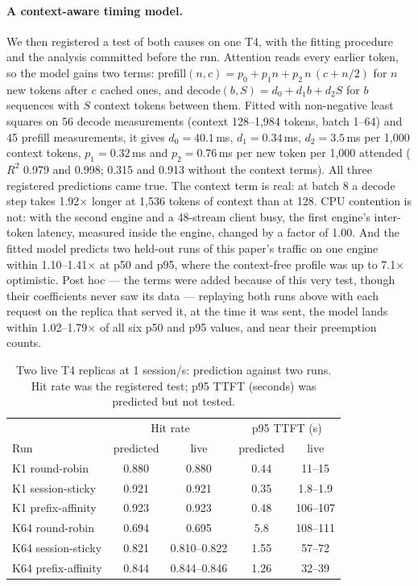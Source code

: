 \documentclass[10pt,twocolumn]{article}
\begin{document}
\paragraph{A context-aware timing model.} We then registered a test of both causes on one T4, with
the fitting procedure and the analysis committed before the run. Attention reads every earlier token,
so the model gains two terms: prefill$(n, c) = p_0 + p_1 n + p_2\, n\,(c + n/2)$ for $n$ new tokens
after $c$ cached ones, and decode$(b, S) = d_0 + d_1 b + d_2 S$ for $b$ sequences with $S$ context
tokens between them. Fitted with non-negative least squares on 56 decode measurements (context
128--1{,}984 tokens, batch 1--64) and 45 prefill measurements, it gives $d_0 = 40.1$\,ms,
$d_1 = 0.34$\,ms, $d_2 = 3.5$\,ms per 1{,}000 context tokens, $p_1 = 0.32$\,ms and $p_2 = 0.76$\,ms per
new token per 1{,}000 attended ($R^2$ 0.979 and 0.998; 0.315 and 0.913 without the context terms).
All three registered predictions came true. The context term is real: at batch 8 a decode step takes
1.92$\times$ longer at 1{,}536 tokens of context than at 128. CPU contention is not: with the second
engine and a 48-stream client busy, the first engine's inter-token latency, measured inside the
engine, changed by a factor of 1.00. And the fitted model predicts two held-out runs of this paper's
traffic on one engine within 1.10--1.41$\times$ at p50 and p95, where the context-free profile was up
to 7.1$\times$ optimistic. Post hoc --- the terms were added because of this very test, though their
coefficients never saw its data --- replaying both runs above with each request on the replica that
served it, at the time it was sent, the model lands within 1.02--1.79$\times$ of all six p50 and p95
values, and near their preemption counts.

\begin{table}[t]
\centering\small
\caption{Two live T4 replicas at 1 session/s: prediction against two runs. Hit rate was the
registered test; p95 TTFT (seconds) was predicted but not tested.}
\label{tab:twolive}
\begin{tabular}{@{}lcccc@{}}
\toprule
 & \multicolumn{2}{c}{Hit rate} & \multicolumn{2}{c}{p95 TTFT (s)} \\
Run & predicted & live & predicted & live \\
\midrule
K1 round-robin     & 0.880 & 0.880 & 0.44 & 11--15 \\
K1 session-sticky  & 0.921 & 0.921 & 0.35 & 1.8--1.9 \\
K1 prefix-affinity & 0.923 & 0.923 & 0.48 & 106--107 \\
K64 round-robin    & 0.694 & 0.695 & 5.8  & 108--111 \\
K64 session-sticky & 0.821 & 0.810--0.822 & 1.55 & 57--72 \\
K64 prefix-affinity & 0.844 & 0.844--0.846 & 1.26 & 32--39 \\
\bottomrule
\end{tabular}
\end{table}
\end{document}
